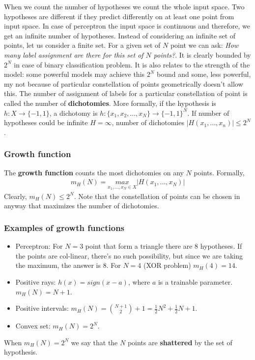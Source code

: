 \documentclass[../../main.tex]{subfiles}
\numberwithin{equation}{section}
\begin{document}
When we count the number of hypotheses we count the whole input space. Two hypotheses are different if they predict differently on at least one point from input space. In case of perceptron the input space is continuous and therefore, we get an infinite number of hypotheses. Instead of considering an infinite set of points, let us consider a finite set. For a given set of $N$ point we can ask: \textit{How many label assignment are there for this set of $N$ points?}. It is clearly bounded by $2^N$ in case of binary classification problem. It is also relates to the strength of the model: some powerful models may achieve this $2^N$ bound and some, less powerful, my not because of particular constellation of points geometrically doesn't allow this. The number of assignment of labels for a particular constellation of point is called the number of \textbf{dichotomies}. More formally, if the hypothesis is $h:X\rightarrow \{ -1, 1 \}$, a dichotomy is $h: \{ x_1, x_2, ..., x_N \}\rightarrow \{ -1, 1 \}^N$. If number of hypotheses could be infinite $H=\infty$, number of dichotomies $|H(x_1, ..., x_n)|\leq 2^N$.


\subsubsection{Growth function}
The \textbf{growth function} counts the most dichotomies on any $N$ points. Formally,
\begin{align}
    m_H(N) = \underset{x_1, ..., x_N\in X}{max}|H(x_1, ..., x_N)|
\end{align}
Clearly, $m_H(N)\leq 2^N$. Note that the constellation of points can be chosen in anyway that maximizes the number of dichotomies. 

\subsubsection*{Examples of growth functions}
\begin{itemize}
    \item Perceptron: For $N=3$ point that form a triangle there are $8$ hypotheses. If the points are col-linear, there's no such possibility, but since we are taking the maximum, the answer is $8$. For $N=4$ (XOR problem) $m_H(4)=14$. 
    \item Positive rays: $h(x)=sign(x-a)$, where $a$ is a trainable parameter. $m_H(N)=N+1$.
    \item Positive intervals: $m_H(N)={N+1 \choose 2} + 1=\frac{1}{2}N^2+\frac{1}{2}N+1$.
    \item Convex set: $m_H(N)=2^N$.
\end{itemize}
When $m_H(N)=2^N$ we say that the $N$ points are \textbf{shattered} by the set of hypothesis.
\end{document}
